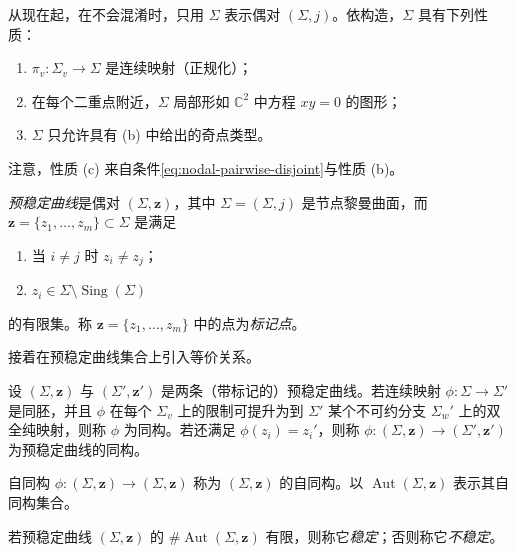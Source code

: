 从现在起，在不会混淆时，只用 $\Sigma$ 表示偶对 $(\Sigma,j)$。依构造，$\Sigma$ 具有下列性质：
\begin{enumerate}[label=(\alph*)]
 \item $\pi_v:\Sigma_v\to\Sigma$ 是连续映射（正规化）；
 \item 在每个二重点附近，$\Sigma$ 局部形如 $\mathbb C^2$ 中方程
 $xy=0$ 的图形；
 \item $\Sigma$ 只允许具有 (b) 中给出的奇点类型。
\end{enumerate}
注意，性质 (c) 来自条件\eqref{eq:nodal-pairwise-disjoint}与性质 (b)。

\begin{definition}\label{def:pre-stable-curve}
\emph{预稳定曲线}是偶对 $(\Sigma,\mathbf z)$，其中
$\Sigma=(\Sigma,j)$ 是节点黎曼曲面，而
$\mathbf z=\{z_1,\ldots,z_m\}\subset\Sigma$ 是满足
\begin{enumerate}[label=(\alph*),start=4]
 \item 当 $i\ne j$ 时 $z_i\ne z_j$；
 \item $z_i\in\Sigma\setminus\operatorname{Sing}(\Sigma)$
\end{enumerate}
的有限集。称 $\mathbf z=\{z_1,\ldots,z_m\}$ 中的点为\emph{标记点}。
\end{definition}

接着在预稳定曲线集合上引入等价关系。

\begin{definition}\label{def:isomorphism-pre-stable-curves}
设 $(\Sigma,\mathbf z)$ 与 $(\Sigma',\mathbf z')$ 是两条（带标记的）预稳定曲线。若连续映射 $\phi:\Sigma\to\Sigma'$ 是同胚，并且 $\phi$ 在每个 $\Sigma_v$ 上的限制可提升为到 $\Sigma'$ 某个不可约分支 $\Sigma_w'$ 上的双全纯映射，则称 $\phi$ 为同构。若还满足 $\phi(z_i)=z_i'$，则称
$\phi:(\Sigma,\mathbf z)\to(\Sigma',\mathbf z')$ 为预稳定曲线的同构。
\end{definition}

自同构 $\phi:(\Sigma,\mathbf z)\to(\Sigma,\mathbf z)$ 称为
$(\Sigma,\mathbf z)$ 的自同构。以 $\operatorname{Aut}(\Sigma,\mathbf z)$ 表示其自同构集合。

\begin{definition}\label{def:stable-curve-finite-automorphisms}
若预稳定曲线 $(\Sigma,\mathbf z)$ 的
$\#\operatorname{Aut}(\Sigma,\mathbf z)$ 有限，则称它\emph{稳定}；否则称它\emph{不稳定}。
\end{definition}

